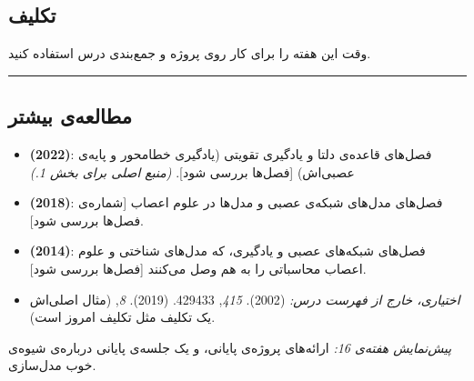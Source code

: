 \subsection{تکلیف}

وقت  این هفته را برای کار روی پروژه و جمع‌بندی درس استفاده کنید.

\begin{center}\rule{0.5\linewidth}{0.5pt}\end{center}

\subsection{مطالعه‌ی بیشتر}

\begin{itemize}
\tightlist
\item
  \textbf{ (2022)}: فصل‌های قاعده‌ی دلتا و یادگیری تقویتی
  (یادگیری خطامحور و پایه‌ی عصبی‌اش) {[}فصل‌ها بررسی شود{]}. \emph{(منبع
  اصلی برای بخش 1.)}
\item
  \textbf{ \lr{\&}  (2018)}: فصل‌های مدل‌های شبکه‌ی
  عصبی و مدل‌ها در علوم اعصاب {[}شماره‌ی فصل‌ها بررسی شود{]}.
\item
  \textbf{ (2014)}: فصل‌های شبکه‌های عصبی و یادگیری، که
  مدل‌های شناختی و علوم اعصاب محاسباتی را به هم وصل می‌کنند {[}فصل‌ها بررسی
  شود{]}.
\item
  \emph{اختیاری، خارج از فهرست درس:}  \lr{\&}  (2002).  \emph{ 415}, 429\lr{--}433.
   \lr{\&}  (2019). 
  \emph{ 8},  (مثال اصلی‌اش یک تکلیف 
  مثل تکلیف امروز است).
\end{itemize}

\emph{پیش‌نمایش هفته‌ی 16:} ارائه‌های پروژه‌ی پایانی، و یک جلسه‌ی پایانی
درباره‌ی شیوه‌ی خوب مدل‌سازی.
